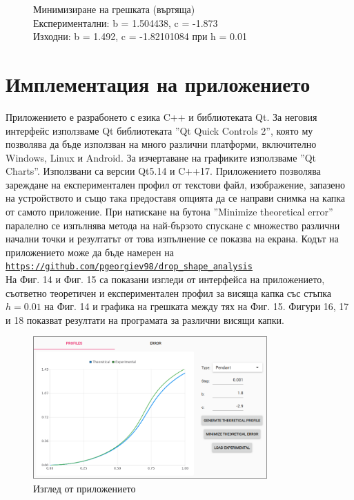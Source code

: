 \documentclass{article}
\begin{document}
\begin{figure}[H]
\begin{minipage}{0.5\textwidth}
  \caption{Минимизиране на грешката (въртяща) \protect\\ Експериментални: b = 1.504438, c = -1.873 \protect\\ Изходни: b = 1.492, c = -1.82101084 при h = 0.01}
\end{minipage}
\end{figure}


\section{Имплементация на приложението}

Приложението е разрабонето с езика C++ и библиотеката Qt. За неговия интерфейс използваме Qt библиотеката ''Qt Quick Controls 2'', която му позволява да бъде използван на много различни платформи, включително Windows, Linux и Android. За изчертаване на графиките използваме ''Qt Charts''. Използвани са версии Qt5.14 и C++17.
Приложението позволява зареждане на експериментален профил от текстови файл, изображение, запазено на устройството и също така предоставя опцията да се направи снимка на капка от самото приложение. При натискане на бутона ''Minimize theoretical error'' паралелно се изпълнява метода на най-бързото спускане с множество различни начални точки и резултатът от това изпълнение се показва на екрана.
Кодът на приложението може да бъде намерен на \texttt{\url{https://github.com/pgeorgiev98/drop_shape_analysis} }\\
\newline
\hspace*{3ex}На Фиг. 14 и Фиг. 15 са показани изгледи от интерфейса на приложението, съответно теоретичен и експериментален профил за висяща капка със стъпка \(h = 0.01 \) на Фиг. 14 и графика на грешката между тях на Фиг. 15. Фигури 16, 17 и 18 показват резултати на програмата за различни висящи капки.

\begin{figure}[H]
\centering
\includegraphics[width=0.8\textwidth]{app-1.png}
\caption{Изглед от приложението}
\end{figure}
\end{document}
